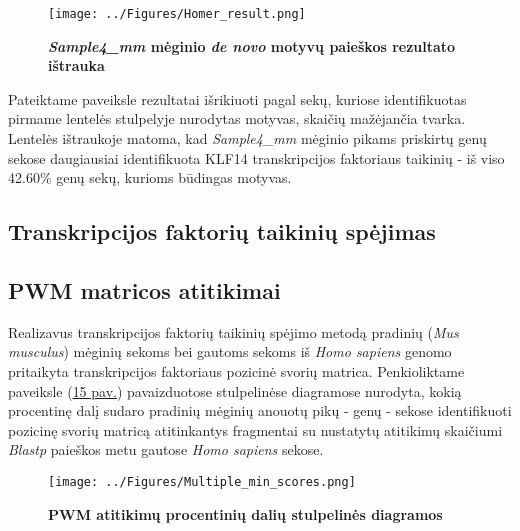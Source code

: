 \documentclass[12pt]{article}
\begin{document}
\begin{figure}[H]
    \begin{center}
        \texttt{[image: ../Figures/Homer\_result.png]}
        \vspace{-1.5\baselineskip}
        \caption{\small\textbf{\emph{Sample4\_mm} mėginio
                                \emph{de novo} motyvų paieškos rezultato
                                ištrauka}}
        \label{fig:image14}
    \end{center}
\end{figure}

Pateiktame paveiksle rezultatai išrikiuoti pagal sekų, kuriose identifikuotas
pirmame lentelės stulpelyje nurodytas motyvas, skaičių mažėjančia tvarka.
Lentelės ištraukoje matoma, kad \emph{Sample4\_mm} mėginio pikams priskirtų
genų sekose daugiausiai identifikuota KLF14 transkripcijos faktoriaus taikinių -
iš viso 42.60\% genų sekų, kurioms būdingas motyvas.

\newpage

\subsection*{Transkripcijos faktorių taikinių spėjimas}

\subsection*{PWM matricos atitikimai}
Realizavus transkripcijos faktorių taikinių spėjimo metodą pradinių
(\emph{Mus musculus}) mėginių sekoms bei gautoms sekoms iš \emph{Homo sapiens}
genomo pritaikyta transkripcijos faktoriaus pozicinė svorių matrica.
Penkioliktame paveiksle (\hyperref[fig:image15]{15 pav.}) pavaizduotose
stulpelinėse diagramose nurodyta, kokią procentinę dalį sudaro pradinių mėginių
anouotų pikų - genų - sekose identifikuoti pozicinę svorių matricą atitinkantys
fragmentai su nustatytų atitikimų skaičiumi \emph{Blastp} paieškos metu gautose
\emph{Homo sapiens} sekose.

\begin{figure}[H]
    \begin{center}
        \texttt{[image: ../Figures/Multiple\_min\_scores.png]}
        \vspace{-1.5\baselineskip}
        \caption{\small\textbf{PWM atitikimų procentinių dalių
                                stulpelinės diagramos}}
        \label{fig:image15}
    \end{center}
\end{figure}
\end{document}
